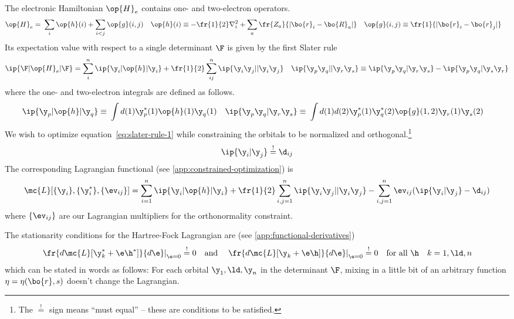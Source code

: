 The electronic Hamiltonian $\op{H}_e$ contains one- and two-electron operators.
\begin{align}
  \op{H}_e
=&\
  \sum_i
  \op{h}(i)
+
  \sum_{i<j}
  \op{g}(i,j)
&
  \op{h}(i)
&\equiv
-
  \fr{1}{2}
  \nabla_i^2
+
  \sum_a
  \fr{Z_a}{|\bo{r}_i-\bo{R}_a|}
&
  \op{g}(i,j)
&\equiv
  \fr{1}{|\bo{r}_i-\bo{r}_j|}
\end{align}
Its expectation value with respect to a single determinant $\F$ is given by the first Slater rule
\begin{align}
\label{eq:slater-rule-1}
  \ip{\F|\op{H}_e|\F}
=
\sum_{i}^n
  \ip{\y_i|\op{h}|\y_i}
+\fr{1}{2}\sum_{ij}^n
  \ip{\y_i\y_j||\y_i\y_j}
&&
  \ip{\y_p\y_q||\y_r\y_s}
\equiv
  \ip{\y_p\y_q|\y_r\y_s}
-
  \ip{\y_p\y_q|\y_s\y_r}
\end{align}
where the one- and two-electron integrals are defined as follows.
\begin{align}
\label{eq:one-and-two-electron-integrals}
  \ip{\y_p|\op{h}|\y_q}
\equiv&\
  \int
  d(1)
  \y_p^*(1)
  \op{h}(1)
  \y_q(1)
&
  \ip{\y_p\y_q|\y_r\y_s}
\equiv&\
  \int
  d(1)d(2)
  \y_p^*(1)\y_q^*(2)
  \op{g}(1,2)
  \y_r(1)\y_s(2)
\end{align}
We wish to optimize equation~\ref{eq:slater-rule-1} while constraining the orbitals to be normalized and orthogonal.\footnote{The $\overset{!}=$ sign means ``must equal'' -- these are conditions to be satisfied.}
\begin{align}
  \ip{\y_i|\y_j}
\overset{!}{=}
  \d_{ij}
\end{align}
The corresponding Lagrangian functional (see \cref{app:constrained-optimization}) is
\begin{align}\label{eq:hartree-fock-lagrangian}
  \mc{L}[\{\y_i\},\{\y_i^*\},\{\ev_{ij}\}]
=
  \sum_{i=1}^n
  \ip{\y_i|\op{h}|\y_i}
+
  \fr{1}{2}
  \sum_{i,j=1}^n
  \ip{\y_i\y_j||\y_i\y_j}
-
  \sum_{i,j=1}^n
  \ev_{ij}(\ip{\y_i|\y_j}-\d_{ij})
\end{align}
where $\{\ev_{ij}\}$ are our Lagrangian multipliers for the orthonormality constraint.

The stationarity conditions for the Hartree-Fock Lagrangian are (see \cref{app:functional-derivatives})
\begin{align}\label{eq:hartree-fock-lagrangian-stationarity}
\left.
  \fr{d\mc{L}[\y_k^*+\e \h^*]}{d\e}
\right|_{\e=0}
\overset{!}=
  0
\hspace{10pt}
  \text{and}
\hspace{10pt}
\left.
  \fr{d\mc{L}[\y_k+\e \h]}{d\e}
\right|_{\e=0}
\overset{!}=
  0
\hspace{10pt}
  \text{for all $\h$}
&&
  k=1,\ld,n
\end{align}
which can be stated in words as follows: For each orbital $\y_1,\ld,\y_n$ in the determinant $\F$, mixing in a little bit of an arbitrary function $\eta=\eta(\bo{r},s)$ doesn't change the Lagrangian.

